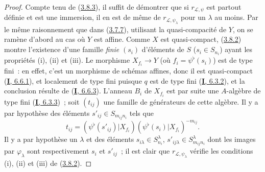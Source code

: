 
\begin{proof}
Compte tenu de (\hyperref[II.3.8.3-fr]{3.8.3}), il suffit de démontrer que si
$r_{\mathcal{L},\psi}$ est partout définie et est une immersion, il en est de
même de $r_{\mathcal{L},\psi_\lambda}$ pour un $\lambda$ au moins. Par le
même raisonnement que dans (\hyperref[II.3.7.7-fr]{3.7.7}), utilisant la
quasi-compacité de $Y$, on se ramène d'abord au cas où $Y$ est affine. Comme
$X$ est quasi-compact, (\hyperref[II.3.8.2-fr]{3.8.2}) montre l'existence
d'une famille \emph{finie} $(s_i)$ d'éléments de $S$ ($s_i\in S_{n_i}$)
ayant les propriétés (i), (ii) et (iii). Le morphisme $X_{f_i}\to Y$ (où
$f_i=\psi^\flat(s_i)$) est de type fini~: en effet, c'est un morphisme de
schémas affines, donc il est quasi-compact
(\hyperref[I.6.6.1-fr]{\textbf{I}, 6.6.1}), et localement de type fini puisque $q$ est
de type fini (\hyperref[I.6.3.2-fr]{\textbf{I}, 6.3.2}), et la conclusion résulte de
(\hyperref[I.6.6.3-fr]{\textbf{I}, 6.6.3}). L'anneau $B_i$ de $X_{f_i}$ est par suite
une $A$-algèbre de type fini (\hyperref[I.6.3.3-fr]{\textbf{I}, 6.3.3})~; soit
$(t_{ij})$ une famille de générateurs de cette algèbre. Il y a par hypothèse
des éléments $s'_{ij}\in S_{m_{ij}n_i}$ tels que
\[
  t_{ij}=(\psi^\flat(s'_{ij})|X_{f_i})
  (\psi^\flat(s_i)|X_{f_i})^{-m_{ij}}.
\]
Il y a par hypothèse un $\lambda$ et des éléments
$s_{i\lambda}\in S_{n_i}^\lambda$,
$s'_{ij\lambda}\in S_{m_{ij}n_i}^\lambda$ dont les images par
$\varphi_\lambda$ sont respectivement $s_i$ et $s'_{ij}$~; il est clair que
$r_{\mathcal{L},\psi_\lambda}$ vérifie les conditions (i), (ii) et (iii) de
(\hyperref[II.3.8.2-fr]{3.8.2}).
\end{proof}

